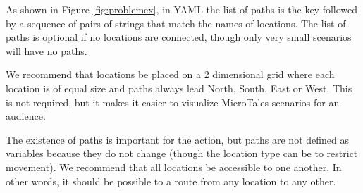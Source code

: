 \documentclass{nilreport}
\begin{document}
As shown in Figure \ref{fig:problemex}, in YAML the list of paths is the key  followed by a sequence of pairs of strings that match the names of locations. The list of paths is optional if no locations are connected, though only very small scenarios will have no paths.

We recommend that locations be placed on a 2 dimensional grid where each location is of equal size and paths always lead North, South, East or West. This is not required, but it makes it easier to visualize MicroTales scenarios for an audience.

The existence of paths is important for the  action, but paths are not defined as \hyperref[sec:variables]{variables} because they do not change (though the  location type can be  to restrict movement). We recommend that all locations be accessible to one another. In other words, it should be possible to  a route from any location to any other.




\end{document}
